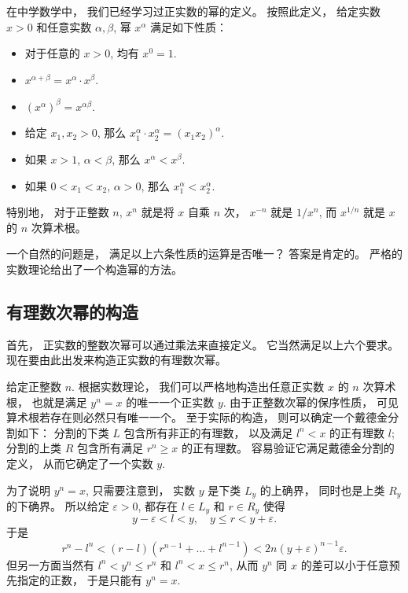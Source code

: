 

在中学数学中， 我们已经学习过正实数的幂的定义。 按照此定义， 给定实数$x>0$ 和任意实数 $\alpha,\beta$, 幂 $x^\alpha$ 满足如下性质：

\begin{itemize}
\item 对于任意的 $x>0$, 均有 $x^0=1$.
\item $x^{\alpha+\beta}=x^\alpha\cdot x^\beta$.
\item $(x^\alpha)^\beta=x^{\alpha\beta}$.
\item 给定 $x_1,x_2>0$, 那么 $x_1^\alpha\cdot x_2^\alpha=(x_1x_2)^\alpha$.
\item 如果 $x>1$, $\alpha<\beta$, 那么 $x^\alpha<x^\beta$.
\item 如果 $0<x_1<x_2$, $\alpha>0$, 那么 $x_1^\alpha<x_2^\alpha$.
\end{itemize}

特别地， 对于正整数 $n$, $x^n$ 就是将 $x$ 自乘 $n$ 次， $x^{-n}$ 就是 $1/x^n$, 而 $x^{1/n}$ 就是 $x$ 的 $n$ 次算术根。 

一个自然的问题是， 满足以上六条性质的运算是否唯一？ 答案是肯定的。 严格的实数理论给出了一个构造幂的方法。

\subsection{有理数次幂的构造}

首先， 正实数的整数次幂可以通过乘法来直接定义。 它当然满足以上六个要求。 现在要由此出发来构造正实数的有理数次幂。

给定正整数 $n$. 根据实数理论， 我们可以严格地构造出任意正实数 $x$ 的 $n$ 次算术根， 也就是满足 $y^n=x$ 的唯一一个正实数 $y$. 由于正整数次幂的保序性质， 可见算术根若存在则必然只有唯一一个。 至于实际的构造， 则可以确定一个戴德金分割如下： 分割的下类 $L$ 包含所有非正的有理数， 以及满足 $l^n<x$ 的正有理数 $l$; 分割的上类 $R$ 包含所有满足 $r^n\geq x$ 的正有理数。 容易验证它满足戴德金分割的定义， 从而它确定了一个实数 $y$. 

为了说明 $y^n=x$, 只需要注意到， 实数 $y$ 是下类 $L_y$ 的上确界， 同时也是上类 $R_y$ 的下确界。 所以给定 $\varepsilon>0$, 都存在 $l\in L_y$ 和 $r\in R_y$ 使得
\[
y-\varepsilon<l<y,\quad y\leq r<y+\varepsilon.
\]
于是
\[ 
r^n-l^n<(r-l)(r^{n-1}+...+l^{n-1})
<2n(y+\varepsilon)^{n-1}\varepsilon.
\]
但另一方面当然有 $l^n<y^n\leq r^n$ 和 $l^n<x\leq r^n$, 从而 $y^n$ 同 $x$ 的差可以小于任意预先指定的正数， 于是只能有 $y^n=x$.

